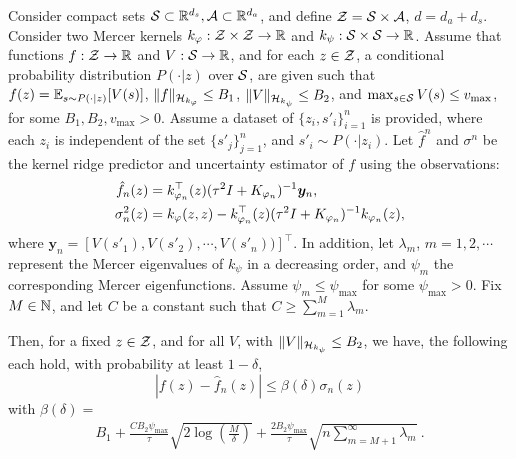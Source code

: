 \begin{theorem}\label{the:conf}

Consider compact sets $\mathcal{S}\subset\mathbb{R}^{d_s}, \mathcal{A}\subset\mathbb{R}^{d_a}$, and define $\mathcal{Z}=\mathcal{S}\times \mathcal{A}$, $d=d_a+d_s$. Consider two Mercer kernels $k_{\varphi}:\mathcal{Z}\times\mathcal{Z}\rightarrow \mathbb{R}$ and  $k_{\psi}:\mathcal{S}\times\mathcal{S}\rightarrow \mathbb{R}$. Assume that functions $f:\mathcal{Z}\rightarrow\mathbb{R}$ and $V:\mathcal{S}\rightarrow\mathbb{R}$, and for each $z\in\mathcal{Z}$, a conditional probability distribution $P(\cdot|z)$ over $\mathcal{S}$, are given such that $f(z)=\mathbb{E}_{s\sim P(\cdot|z)}[V(s)]$, $\|f\|_{\mathcal{H}_{k_\varphi}}\le B_1$, $\|V\|_{\mathcal{H}_{k_\psi}}\le B_2$, and $\max_{s\in\mathcal{S}}V(s)\le v_{\max}$, for some $B_1,B_2, v_{\max}>0$.
Assume a dataset of $\{z_{i}, s'_i\}_{i=1}^n$ is provided, where each $z_i$ is independent of the set $\{s'_j\}_{j=1}^n$, and $s'_i\sim P(\cdot|z_i)$.
Let $\hat{f}^n$ and $\sigma^n$ be the kernel ridge predictor and uncertainty estimator of $f$ using the observations:
\begin{align}\nonumber
    \hat{f}_n(z) &= k^{\top}_{\varphi_n}(z)(\tau^2I+K_{\varphi_n})^{-1}\bm{y}_{n},\\
    \sigma_n^2(z) &= k_{\varphi}(z,z) - k^{\top}_{\varphi_n}(z)(\tau^2I+K_{\varphi_n})^{-1}k_{\varphi_n}(z),
\end{align}
where $\bm{y}_n=[V(s'_1), V(s'_2), \cdots, V(s'_n))]^{\top}$.
In addition, let $\lambda_m$, $m=1,2,\cdots$ represent the Mercer eigenvalues of $k_{\psi}$ in a decreasing order, and $\psi_m$ the corresponding Mercer eigenfunctions. Assume $\psi_m\le \psi_{\max}$ for some $\psi_{\max}>0$. Fix $M\in \mathbb{N}$, and let $C$ be a constant such that $C \geq \sum_{m=1}^{M} \lambda_m$. %


Then, for a fixed $z\in\mathcal{Z}$, and for all $V$, with $\|V\|_{\mathcal{H}_{k_\psi}}\le B_2$, we have, the following each hold, with probability at least $1-\delta$,
\begin{equation*}
|f(z) - \hat{f}_n(z)| \le \beta(\delta) \sigma_n(z)
\end{equation*}
with $\beta(\delta) =$
\small{\begin{align*}
     B_1+ \frac{C B_2 \psi_{\max} }{\tau}\sqrt{2\log(\frac{M}{\delta})} 
    + \frac{2B_2\psi_{\max}}{\tau}\sqrt{n\sum_{m=M+1}^{\infty}\lambda_m}~.
\end{align*}}

\end{theorem}




